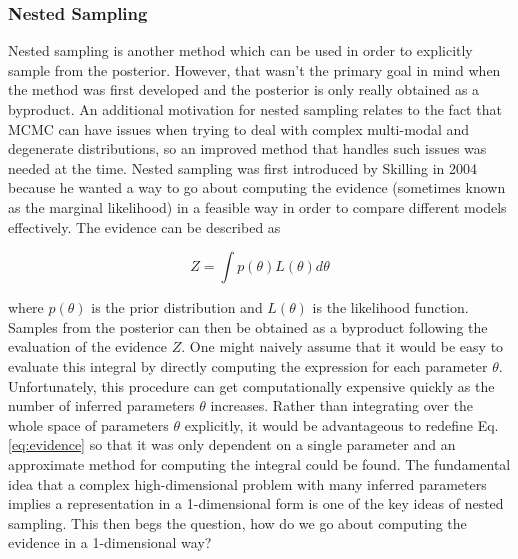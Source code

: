 %
%

%
\subsubsection{Nested Sampling}

Nested sampling is another method which can be used in order to explicitly sample from the posterior. However, that wasn't the primary goal in mind when the method was first developed and the posterior is only really obtained as a byproduct. An additional motivation for nested sampling relates to the fact that \ac{MCMC} can have issues when trying to deal with complex multi-modal and degenerate distributions, so an improved method that handles such issues was needed at the time. Nested sampling was first introduced by Skilling in 2004 because he wanted a way to go about computing the evidence (sometimes known as the marginal likelihood) in a feasible way in order to compare different models effectively. The evidence can be described as

\begin{equation}
    Z = \int p(\theta) L(\theta) d\theta \label{eq:evidence}
\end{equation}

where $p(\theta)$ is the prior distribution and $L(\theta)$ is the likelihood function. Samples from the posterior can then be obtained as a byproduct following the evaluation of the evidence $Z$. One might naively assume that it would be easy to evaluate this integral by directly computing the expression for each parameter $\theta$. Unfortunately, this procedure can get computationally expensive quickly as the number of inferred parameters $\theta$ increases. Rather than integrating over the whole space of parameters $\theta$ explicitly, it would be advantageous to redefine Eq. \ref{eq:evidence} so that it was only dependent on a single parameter and an approximate method for computing the integral could be found. The fundamental idea that a complex high-dimensional problem with many inferred parameters implies a representation in a 1-dimensional form is one of the key ideas of nested sampling. This then begs the question, how do we go about computing the evidence in a 1-dimensional way?

